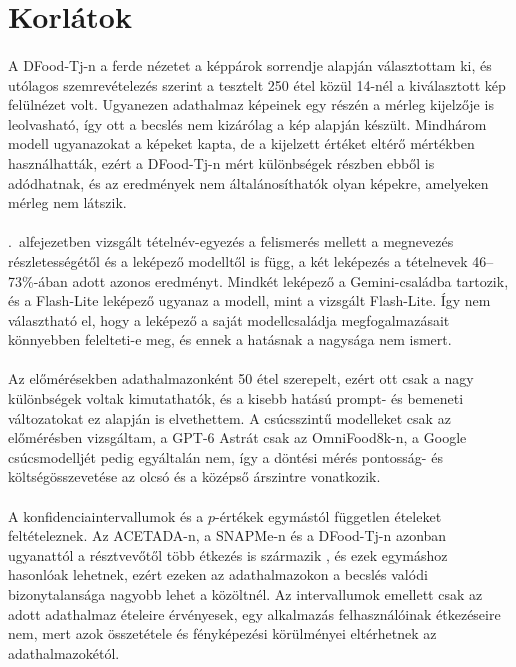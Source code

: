 \section{Korlátok}
\paragraph{}A DFood-Tj-n a ferde nézetet a képpárok sorrendje alapján választottam ki, és utólagos 
szemrevételezés szerint a tesztelt 250 étel közül 14-nél a kiválasztott kép felülnézet volt. Ugyanezen 
adathalmaz képeinek egy részén a mérleg kijelzője is leolvasható, így ott a becslés nem kizárólag a 
kép alapján készült. Mindhárom modell ugyanazokat a képeket kapta, de a kijelzett értéket eltérő 
mértékben használhatták, ezért a DFood-Tj-n mért különbségek részben ebből is adódhatnak, és az 
eredmények nem általánosíthatók olyan képekre, amelyeken mérleg nem látszik.
\paragraph{}\Az{\ref{sec:felismeres}}.~alfejezetben vizsgált tételnév-egyezés a felismerés 
mellett a megnevezés részletességétől és a leképező modelltől is függ, a két leképezés a 
tételnevek 46--73\%-ában adott azonos eredményt. Mindkét leképező a Gemini-családba tartozik, 
és a Flash-Lite leképező ugyanaz a modell, mint a vizsgált Flash-Lite. Így nem választható el, 
hogy a leképező a saját modellcsaládja megfogalmazásait könnyebben felelteti-e meg, és ennek a 
hatásnak a nagysága nem ismert.
\paragraph{}Az előmérésekben adathalmazonként 50 étel szerepelt, ezért ott csak a nagy különbségek 
voltak kimutathatók, és a kisebb hatású prompt- és bemeneti változatokat ez alapján is elvethettem. 
A csúcsszintű modelleket csak az előmérésben vizsgáltam, a GPT-6 Astrát csak az OmniFood8k-n, a 
Google csúcsmodelljét pedig egyáltalán nem, így a döntési mérés pontosság- és költségösszevetése 
az olcsó és a középső árszintre vonatkozik.
\paragraph{}A konfidenciaintervallumok és a $p$-értékek egymástól független ételeket feltételeznek. 
Az ACETADA-n, a SNAPMe-n és a DFood-Tj-n azonban ugyanattól a résztvevőtől több étkezés is származik 
\cite{coburn2025acetada, larke2023snapme, jin2026dfoodtj}, és ezek egymáshoz hasonlóak lehetnek, ezért ezeken 
az adathalmazokon a becslés valódi bizonytalansága nagyobb lehet a közöltnél. Az intervallumok 
emellett csak az adott adathalmaz ételeire érvényesek, egy alkalmazás felhasználóinak étkezéseire 
nem, mert azok összetétele és fényképezési körülményei eltérhetnek az adathalmazokétól.
